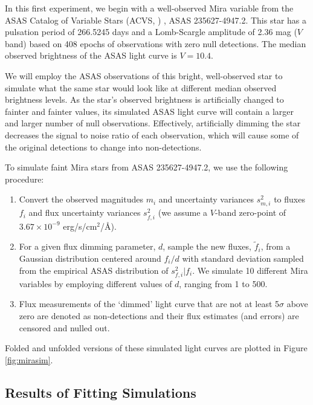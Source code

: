 \documentclass[12pt,preprint]{aastex}
\begin{document}
In this first experiment, we begin with a well-observed Mira variable from the ASAS Catalog of Variable Stars (ACVS, \citealt{acvs}) , ASAS 235627-4947.2.  This star has a pulsation period of 266.5245 days and a Lomb-Scargle amplitude of 2.36 mag ($V$ band) based on 408 epochs of observations with zero null detections.  The median observed brightness of the ASAS light curve is $V = 10.4$.

We will employ the ASAS observations of this bright, well-observed star to simulate what the same star would look like at different median observed brightness levels.  As the star's observed brightness is artificially changed to fainter and fainter values, its simulated ASAS light curve will contain a larger and larger number of null observations.  Effectively, artificially dimming the star decreases the signal to noise ratio of each observation, which will cause some of the original detections to change into non-detections.

To simulate faint Mira stars from ASAS 235627-4947.2, we use the following procedure:
\begin{enumerate}
\item Convert the observed magnitudes $m_i$ and uncertainty variances $s^2_{m,i}$ to fluxes $f_i$ and flux uncertainty variances $s^2_{f,i}$ (we assume a $V$-band zero-point of $3.67\times10^{-9}$ erg/s/cm$^2$/\AA).
\item For a given flux dimming parameter, $d$, sample the new fluxes, $\tilde{f}_i$, from a Gaussian distribution centered around $f_i / d$ with standard deviation sampled from the empirical ASAS distribution of $s^2_{f,i} | f_i$. We simulate 10 different Mira variables by employing different values of $d$, ranging from 1 to 500.
\item Flux measurements of the `dimmed' light curve that are not at least 5$\sigma$ above zero are denoted as non-detections and their flux estimates (and errors) are censored and nulled out.
\end{enumerate}
Folded and unfolded versions of these simulated light curves are plotted in Figure \ref{fig:mirasim}.


\subsection{Results of Fitting Simulations}
\end{document}
